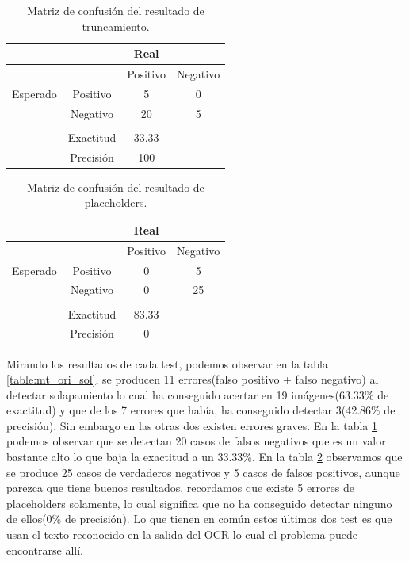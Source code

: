 \begin{table}[H]
	\centering
	\begin{tabular}{|c|c|c|c|}
		\hline
		& & Real &   \\
		\hline
		&          & Positivo & Negativo                   \\
		\hline
		Esperado & Positivo & 5& 0 \\
		\hline
		& Negativo & 		  20& 5                 \\
		\hline
		 						&&&\\
		\hline
		&Exactitud& 33.33 & \\
		\hline
		&Precisión& 100 &\\
		\hline
	\end{tabular}
	\caption{Matriz de confusión del resultado de truncamiento.}
\label{table:mt_ori_trun}
\end{table}
\begin{table}[H]
	\centering
	\begin{tabular}{|c|c|c|c|}
		\hline
		& & Real &   \\
		\hline
		&          & Positivo & Negativo                   \\
		\hline
		Esperado & Positivo & 0& 5 \\
		\hline
		& Negativo & 		  0& 25                \\
		\hline
		 						&&&\\
		\hline
		&Exactitud& 83.33 & \\
		\hline
		&Precisión& 0 &\\
		\hline
	\end{tabular}
	\caption{Matriz de confusión del resultado de placeholders.}
\label{table:mt_ori_place}
\end{table}
Mirando los resultados de cada test, podemos observar en la tabla \ref{table:mt_ori_sol}, se producen 11 errores(falso positivo + falso negativo) al detectar solapamiento lo cual ha conseguido acertar en 19 imágenes(63.33\% de exactitud) y que de los 7 errores que había, ha conseguido detectar 3(42.86\% de precisión). Sin embargo en las otras dos existen errores graves. En la tabla \ref{table:mt_ori_trun} podemos observar que se detectan 20 casos de falsos negativos que es un valor bastante alto lo que baja la exactitud a un 33.33\%. En la tabla \ref{table:mt_ori_place} observamos que se produce 25 casos de verdaderos negativos y 5 casos de falsos positivos, aunque parezca que tiene buenos resultados, recordamos que existe 5 errores de placeholders solamente, lo cual significa que no ha conseguido detectar ninguno de ellos(0\% de precisión). 
Lo que tienen en común estos últimos dos test es que usan el texto reconocido en la salida del OCR lo cual el problema puede encontrarse allí.

